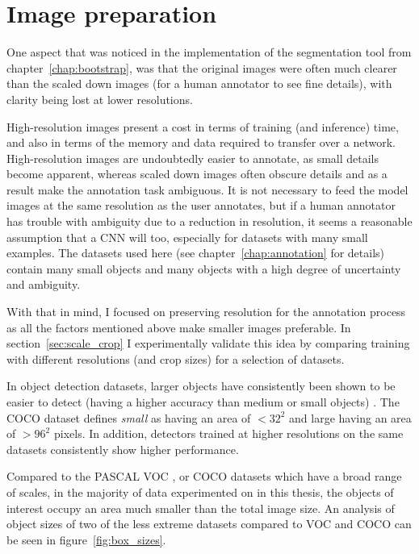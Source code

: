 \section {Image preparation}

One aspect that was noticed in the implementation of the segmentation tool from chapter~\ref{chap:bootstrap}, was that the original images were often much clearer than the scaled down images (for a human annotator to see fine details), with clarity being lost at lower resolutions. 

High-resolution images present a cost in terms of training (and inference) time, and also in terms of the memory and data required to transfer over a network. High-resolution images are undoubtedly easier to annotate, as small details become apparent, whereas scaled down images often obscure details and as a result make the annotation task ambiguous. It is not necessary to feed the model images at the same resolution as the user annotates, but if a human annotator has trouble with ambiguity due to a reduction in resolution, it seems a reasonable assumption that a \gls{CNN} will too, especially for datasets with many small examples. The datasets used here (see chapter~\ref{chap:annotation} for details) contain many small objects and many objects with a high degree of uncertainty and ambiguity.

With that in mind, I focused on preserving resolution for the annotation process as all the factors mentioned above make smaller images preferable. In section~\ref{sec:scale_crop} I experimentally validate this idea by comparing training with different resolutions (and crop sizes) for a selection of datasets.

In object detection datasets, larger objects have consistently been shown to be easier to detect (having a higher accuracy than medium or small objects) \cite{Lin2014, Wang2017, Lin2017a, Law2018, Zhou2019}. The COCO dataset defines \emph{small} as having an area of $<32^2$ and large having an area of $>96^2$ pixels. In addition, detectors trained at higher resolutions on the same datasets consistently show higher performance.

 Compared to the PASCAL VOC \cite{Everingham2008}, or COCO \cite{Lin2014} datasets which have a broad range of scales, in the majority of data experimented on in this thesis, the objects of interest occupy an area much smaller than the total image size. An analysis of object sizes of two of the less extreme datasets compared to VOC and COCO can be seen in figure~\ref{fig:box_sizes}. 

